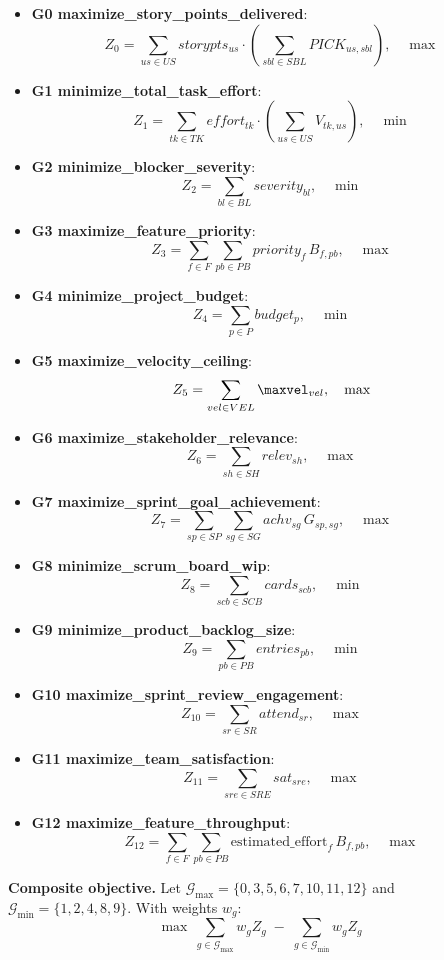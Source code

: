 \documentclass[11pt,a4paper]{article}
\begin{document}
\begin{itemize}
  \item \textbf{G0 maximize\_story\_points\_delivered}:
  \[
    Z_{0} = \sum_{us\in US} storypts_{us} \cdot \left( \sum_{sbl\in SBL} PICK_{us,sbl} \right),
    \quad \max
  \]
  \item \textbf{G1 minimize\_total\_task\_effort}:
  \[
    Z_{1} = \sum_{tk\in TK} effort_{tk} \cdot \left( \sum_{us\in US} V_{tk,us} \right),
    \quad \min
  \]
  \item \textbf{G2 minimize\_blocker\_severity}:
  \[
    Z_{2} = \sum_{bl\in BL} severity_{bl}, \quad \min
  \]
  \item \textbf{G3 maximize\_feature\_priority}:
  \[
    Z_{3} = \sum_{f\in F}\sum_{pb\in PB} priority_{f}\, B_{f,pb}, \quad \max
  \]
  \item \textbf{G4 minimize\_project\_budget}:
  \[
    Z_{4} = \sum_{p\in P} budget_{p}, \quad \min
  \]
  \item \textbf{G5 maximize\_velocity\_ceiling}:
  \[
    Z_{5} = \sum_{vel\in VEL} \maxvel_{vel}, \quad \max
  \]
  \item \textbf{G6 maximize\_stakeholder\_relevance}:
  \[
    Z_{6} = \sum_{sh\in SH} relev_{sh}, \quad \max
  \]
  \item \textbf{G7 maximize\_sprint\_goal\_achievement}:
  \[
    Z_{7} = \sum_{sp\in SP}\sum_{sg\in SG} achv_{sg}\, G_{sp,sg}, \quad \max
  \]
  \item \textbf{G8 minimize\_scrum\_board\_wip}:
  \[
    Z_{8} = \sum_{scb\in SCB} cards_{scb}, \quad \min
  \]
  \item \textbf{G9 minimize\_product\_backlog\_size}:
  \[
    Z_{9} = \sum_{pb\in PB} entries_{pb}, \quad \min
  \]
  \item \textbf{G10 maximize\_sprint\_review\_engagement}:
  \[
    Z_{10} = \sum_{sr\in SR} attend_{sr}, \quad \max
  \]
  \item \textbf{G11 maximize\_team\_satisfaction}:
  \[
    Z_{11} = \sum_{sre\in SRE} sat_{sre}, \quad \max
  \]
  \item \textbf{G12 maximize\_feature\_throughput}:
  \[
    Z_{12} = \sum_{f\in F} \sum_{pb\in PB} \mathrm{estimated\_effort}_f \, B_{f,pb}, \quad \max
  \]
\end{itemize}

\noindent\textbf{Composite objective.} Let $\mathcal{G}_{\max}=\{0,3,5,6,7,10,11,12\}$ and $\mathcal{G}_{\min}=\{1,2,4,8,9\}$. With weights $w_g$:
\[
\max\ \sum_{g\in \mathcal{G}_{\max}} w_g Z_g \;-\; \sum_{g\in \mathcal{G}_{\min}} w_g Z_g
\]
\end{document}

